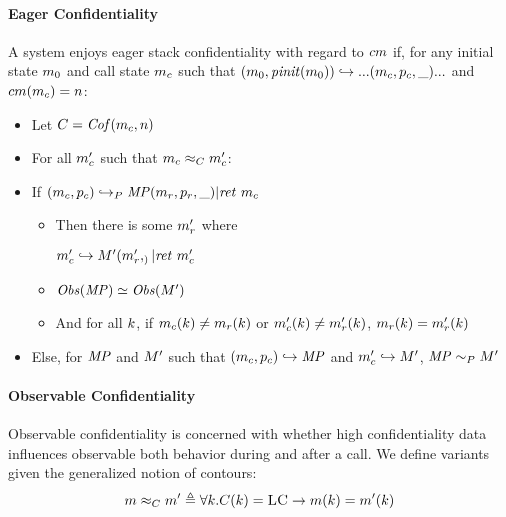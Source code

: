 \documentclass[conference]{IEEEtran}
\begin{document}
    \paragraph{Eager Confidentiality}

      A system enjoys eager stack confidentiality with regard to \(cm\) if, for any initial state
      \(m_0\) and call state \(m_c\) such that
      \((m_0,\mathit{pinit}(m_0)) \hookrightarrow ... (m_c,p_c,\_) ...\) and
      \(cm(m_c) = n\):

      \begin{itemize}
        \item Let \(C = \mathit{Cof}(m_c,n)\)
        \item For all \(m_c'\) such that \(m_c \approx_C m_c'\):
        \item If \((m_c,p_c) \hookrightarrow_P \mathit{MP} (m_r,p_r,\_) | \mathit{ret}\ m_c\)
          \begin{itemize}
            \item Then there is some \(m_r'\) where
              
              \(m_c' \hookrightarrow M' (m_r',_) | \mathit{ret}\ m_c'\)
            \item \(\mathit{Obs}(\mathit{MP}) \simeq \mathit{Obs}(M')\)
            \item And for all \(k\), if \(m_c(k) \not = m_r(k)\) or
              \(m_c'(k) \not = m_r'(k)\), \(m_r(k) = m_r'(k)\)
          \end{itemize}
        \item Else, for \(\mathit{MP}\) and \(M'\) such that \((m_c,p_c) \hookrightarrow \mathit{MP}\)
          and \(m_c' \hookrightarrow M'\), \(\mathit{MP} \sim_P M'\)
      \end{itemize}

    \paragraph{Observable Confidentiality}

      Observable confidentiality is concerned with whether high confidentiality data influences
      observable both behavior during and after a call. We define variants given the generalized notion
      of contours:
      \[m \approx_C m' \triangleq \forall k .
        C(k) = \textsc{LC} \rightarrow m(k) = m'(k)\]
\end{document}
